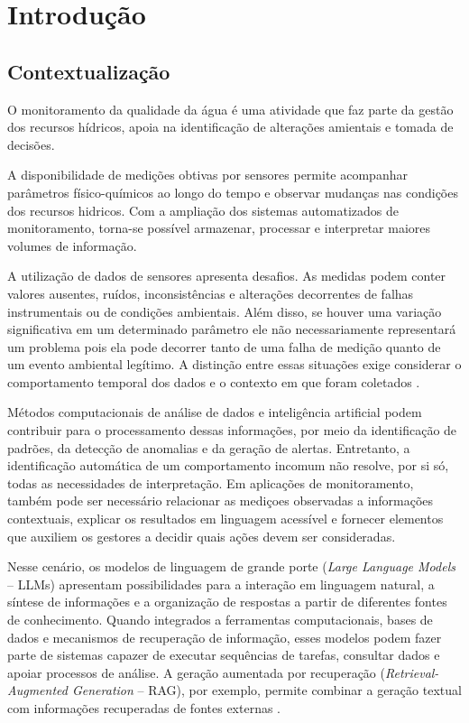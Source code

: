 \chapter{Introdução}
\label{cap:introducao}

\section{Contextualização}
\label{sec:contextualizacao}
O monitoramento da qualidade da água é uma atividade que faz parte da gestão dos recursos hídricos, apoia na identificação de alterações amientais e tomada de decisões. 

A disponibilidade de medições obtivas por sensores permite acompanhar parâmetros físico-químicos ao longo do tempo e observar mudanças nas condições dos recursos hidricos. Com a ampliação dos sistemas automatizados de monitoramento, torna-se possível armazenar, processar e interpretar maiores volumes de informação.

A utilização de dados de sensores apresenta desafios. As medidas podem conter valores ausentes, ruídos, inconsistências e alterações decorrentes de falhas instrumentais ou de condições ambientais. Além disso, se houver uma variação significativa em um determinado parâmetro ele não necessariamente representará um problema pois ela pode decorrer tanto de uma falha de medição quanto de um evento ambiental legítimo. A distinção entre essas situações exige considerar o comportamento temporal dos dados e o contexto em que foram coletados \cite{leigh2019framework}.

Métodos computacionais de análise de dados e inteligência artificial podem contribuir para o processamento dessas informações, por meio da identificação de padrões, da detecção de anomalias e da geração de alertas. Entretanto, a identificação automática de um comportamento incomum não resolve, por si só, todas as necessidades de interpretação. Em aplicações de monitoramento, também pode ser necessário relacionar as mediçoes observadas a informações contextuais, explicar os resultados em linguagem acessível e fornecer elementos que auxiliem os gestores a decidir quais ações devem ser consideradas.

Nesse cenário, os modelos de linguagem de grande porte (\textit{Large Language Models} -- LLMs) apresentam possibilidades para a interação em linguagem natural, a síntese de informações e a organização de respostas a partir de diferentes fontes de conhecimento. Quando integrados a ferramentas computacionais, bases de dados e mecanismos de recuperação de informação, esses modelos podem fazer parte de sistemas capazer de executar sequências de tarefas, consultar dados e apoiar processos de análise. A geração aumentada por recuperação (\textit{Retrieval-Augmented Generation} -- RAG), por exemplo, permite combinar a geração textual com informações recuperadas de fontes externas \cite{lewis2020rag}.

